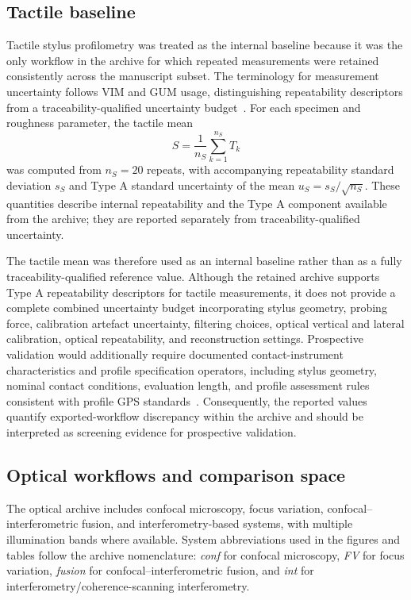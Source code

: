 \documentclass{article}
\begin{document}
\subsection{Tactile baseline}
Tactile stylus profilometry was treated as the internal baseline because it was the only workflow in the archive for which repeated measurements were retained consistently across the manuscript subset. The terminology for measurement uncertainty follows VIM and GUM usage, distinguishing repeatability descriptors from a traceability-qualified uncertainty budget~\cite{JCGM200-2012,JCGM100-2008}. For each specimen and roughness parameter, the tactile mean
\[
S=\frac{1}{n_S}\sum_{k=1}^{n_S}T_k
\]
was computed from $n_S=20$ repeats, with accompanying repeatability standard deviation $s_S$ and Type A standard uncertainty of the mean $u_S=s_S/\sqrt{n_S}$. These quantities describe internal repeatability and the Type A component available from the archive; they are reported separately from traceability-qualified uncertainty.

The tactile mean was therefore used as an internal baseline rather than as a fully traceability-qualified reference value. Although the retained archive supports Type A repeatability descriptors for tactile measurements, it does not provide a complete combined uncertainty budget incorporating stylus geometry, probing force, calibration artefact uncertainty, filtering choices, optical vertical and lateral calibration, optical repeatability, and reconstruction settings. Prospective validation would additionally require documented contact-instrument characteristics and profile specification operators, including stylus geometry, nominal contact conditions, evaluation length, and profile assessment rules consistent with profile GPS standards~\cite{ISO3274-1996,ISO21920-3-2021}. Consequently, the reported values quantify exported-workflow discrepancy within the archive and should be interpreted as screening evidence for prospective validation.

\subsection{Optical workflows and comparison space}
The optical archive includes confocal microscopy, focus variation, confocal--interferometric fusion, and interferometry-based systems, with multiple illumination bands where available. System abbreviations used in the figures and tables follow the archive nomenclature: \emph{conf} for confocal microscopy, \emph{FV} for focus variation, \emph{fusion} for confocal--interferometric fusion, and \emph{int} for interferometry/coherence-scanning interferometry.
\end{document}
